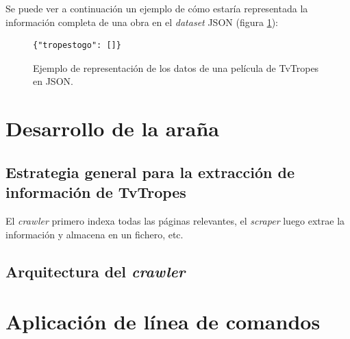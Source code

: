 Se puede ver a continuación un ejemplo de cómo estaría representada la
información completa de una obra en el \textit{dataset} JSON
(figura \ref{fig:json-dataset}):
\begin{figure}[H]
    \begin{verbatim} 
{"tropestogo": []}
    \end{verbatim}
    \caption{Ejemplo de representación de los datos de una película de TvTropes en JSON.}
    \label{fig:json-dataset}
\end{figure}

\section{Desarrollo de la araña}

\subsection{Estrategia general para la extracción de información de TvTropes}
El \textit{crawler} primero indexa todas las páginas relevantes, el
\textit{scraper} luego extrae la información y almacena en un fichero, etc.

\subsection{Arquitectura del \textit{crawler}}

\section{Aplicación de línea de comandos}
